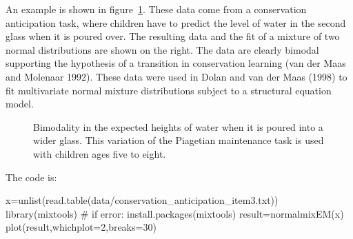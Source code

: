 \documentclass[
  a4paper,
  DIV=11,
  numbers=noendperiod,
  oneside]{scrreprt}
\newenvironment{Shaded}{}{}
\newcommand{\AttributeTok}[1]{\textcolor[rgb]{0.84,0.23,0.29}{#1}}
\newcommand{\CommentTok}[1]{\textcolor[rgb]{0.42,0.45,0.49}{#1}}
\newcommand{\DecValTok}[1]{\textcolor[rgb]{0.00,0.36,0.77}{#1}}
\newcommand{\FunctionTok}[1]{\textcolor[rgb]{0.44,0.26,0.76}{#1}}
\newcommand{\NormalTok}[1]{\textcolor[rgb]{0.14,0.16,0.18}{#1}}
\newcommand{\OtherTok}[1]{\textcolor[rgb]{0.44,0.26,0.76}{#1}}
\newcommand{\StringTok}[1]{\textcolor[rgb]{0.01,0.18,0.38}{#1}}
\begin{document}
An example is shown in figure~\ref{fig-ch3-img20-old-32}. These data
come from a conservation anticipation task, where children have to
predict the level of water in the second glass when it is poured over.
The resulting data and the fit of a mixture of two normal distributions
are shown on the right. The data are clearly bimodal supporting the
hypothesis of a transition in conservation learning (van der Maas and
Molenaar 1992). These data were used in Dolan and van der Maas (1998) to
fit multivariate normal mixture distributions subject to a structural
equation model.

\begin{figure}


\caption{\label{fig-ch3-img20-old-32}Bimodality in the expected heights
of water when it is poured into a wider glass. This variation of the
Piagetian maintenance task is used with children ages five to eight.}

\end{figure}%

The code is:

\begin{Shaded}
\begin{Highlighting}[]
\NormalTok{x}\OtherTok{=}\FunctionTok{unlist}\NormalTok{(}\FunctionTok{read.table}\NormalTok{(}\StringTok{\textquotesingle{}data/conservation\_anticipation\_item3.txt\textquotesingle{}}\NormalTok{))}
\FunctionTok{library}\NormalTok{(mixtools) }\CommentTok{\# if error: install.packages(\textquotesingle{}mixtools\textquotesingle{})}
\NormalTok{result}\OtherTok{=}\FunctionTok{normalmixEM}\NormalTok{(x)}
\FunctionTok{plot}\NormalTok{(result,}\AttributeTok{whichplot=}\DecValTok{2}\NormalTok{,}\AttributeTok{breaks=}\DecValTok{30}\NormalTok{)}
\end{Highlighting}
\end{Shaded}
\end{document}
